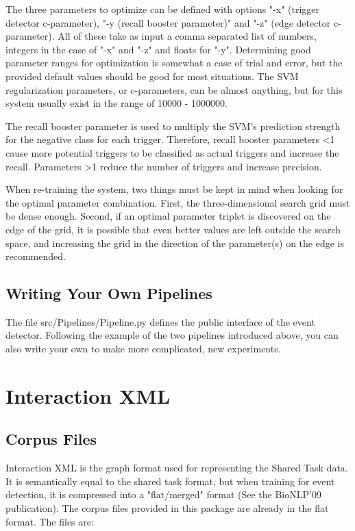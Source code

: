 \documentclass[a4paper,12pt]{article}
\begin{document}
The three parameters to optimize can be defined with options "-x" (trigger detector c-parameter), "-y (recall booster parameter)" and "-z" (edge detector c-parameter). All of these take as input a comma separated list of numbers, integers in the case of "-x" and "-z" and floats for "-y". Determining good parameter ranges for optimization is somewhat a case of trial and error, but the provided default values should be good for most situations. The SVM regularization parameters, or c-parameters, can be almost anything, but for this system usually exist in the range of 10000 - 1000000. 

The recall booster parameter is used to multiply the SVM's prediction strength for the negative class for each trigger. Therefore, recall booster parameters <1 cause more potential triggers to be classified as actual triggers and increase the recall. Parameters >1 reduce the number of triggers and increase precision.

When re-training the system, two things must be kept in mind when looking for the optimal parameter combination. First, the three-dimensional search grid must be dense enough. Second, if an optimal parameter triplet is discovered on the edge of the grid, it is possible that even better values are left outside the search space, and increasing the grid in the direction of the parameter(s) on the edge is recommended.

\subsection{Writing Your Own Pipelines}

The file src/Pipelines/Pipeline.py defines the public interface of the event detector. Following the example of the two pipelines introduced above, you can also write your own to make more complicated, new experiments.

\section{Interaction XML}

\subsection{Corpus Files}

Interaction XML is the graph format used for representing the Shared Task data. It is semantically equal to the shared task format, but when training for event detection, it is compressed into a "flat/merged" format (See the BioNLP'09 publication). The corpus files provided in this package are already in the flat format. The files are:
\end{document}
